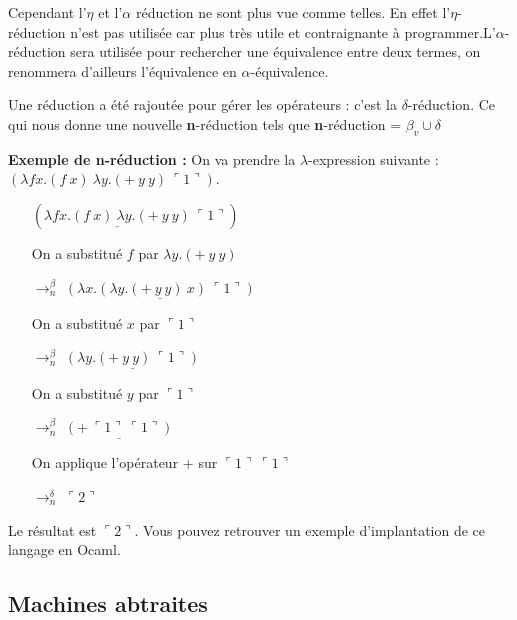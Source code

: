 \documentclass[10pt,a4paper]{article}
\begin{document}
				Cependant l'$\eta$ et l'$\alpha$ réduction ne sont plus vue comme telles. En effet l'$\eta$-réduction n'est pas utilisée car plus très utile et contraignante à programmer.L'$\alpha$-réduction sera utilisée pour rechercher une équivalence entre deux termes, on renommera d'ailleurs l'équivalence en $\alpha$-équivalence.
				\medbreak
				
				Une réduction a été rajoutée pour gérer les opérateurs : c'est la $\delta$-réduction. Ce qui nous donne une nouvelle \textbf{n}-réduction tels que \textbf{n}-réduction = $\beta_{v} \cup \delta$
				\bigbreak
				
				
				\textbf{Exemple de \textbf{n}-réduction :} On va prendre la $\lambda$-expression suivante : $(\lambda f x.(f~x)~\lambda y.(+~y~y)~\ulcorner 1\urcorner)$. 
				\smallbreak
				\begin{itemize}
					\item[] $(\underline{\lambda f x.(f~x)~\lambda y.(+~y~y)}~\ulcorner 1\urcorner)$
					\item[] On a substitué $f$ par $\lambda y.(+~y~y)$
					\item[$\rightarrow^{\beta}_{n}$] $\underline{(\lambda x.(\lambda y.(+~y~y)~x)~\ulcorner 1\urcorner)}$
					
					\item[] On a substitué $x$ par $\ulcorner 1\urcorner$
					\item[$\rightarrow^{\beta}_{n}$] $\underline{(\lambda y.(+~y~y)~\ulcorner 1\urcorner)}$
					
					\item[] On a substitué $y$ par $\ulcorner 1\urcorner$
					\item[$\rightarrow^{\beta}_{n}$] $\underline{(+~\ulcorner 1\urcorner~\ulcorner 1\urcorner)}$
					
					\item[] On applique l'opérateur $+$ sur $\ulcorner 1\urcorner~\ulcorner 1\urcorner$
					\item[$\rightarrow^{\delta}_{n}$] $\ulcorner 2\urcorner$
				\end{itemize}
				\smallbreak
				Le résultat est $\ulcorner 2\urcorner$. Vous pouvez retrouver un exemple d'implantation de ce langage en Ocaml.
				\newpage
				
				
				
		\subsection{Machines abtraites}
		
\end{document}

